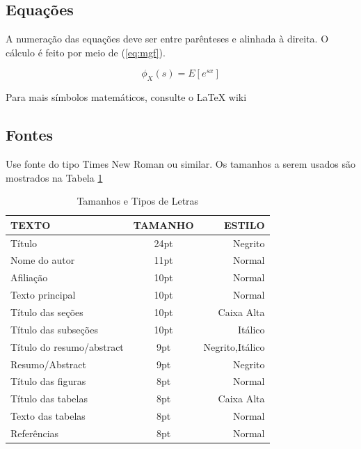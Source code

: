 \subsection{Equações}
A numeração das equações deve ser entre parênteses e alinhada à direita. O cálculo é feito por meio de (\ref{eq:mgf}).

\begin{equation}
\label{eq:mgf}
\phi_X(s)=E[e^{sx}]
\end{equation}

Para mais símbolos matemáticos, consulte o LaTeX wiki \cite{latexMath}

\subsection{Fontes}

Use fonte do tipo Times New Roman ou similar. Os tamanhos a serem usados são mostrados na Tabela \ref{tab:tabela1}

\begin{table}[h]
\centering
\caption{Tamanhos e Tipos de Letras}
\label{tab:tabela1}
\begin{adjustbox}{max width=\textwidth}
\begin{tabular}{lcr}
\hline
TEXTO                     & TAMANHO & ESTILO          \\ \hline
Título                    & 24pt    & Negrito         \\
Nome do autor             & 11pt    & Normal          \\
Afiliação                 & 10pt    & Normal          \\
Texto principal           & 10pt    & Normal          \\
Título das seções         & 10pt    & Caixa Alta      \\
Título das subseções      & 10pt    & Itálico         \\
Título do resumo/abstract & 9pt     & Negrito,Itálico \\
Resumo/Abstract           & 9pt     & Negrito         \\
Título das figuras        & 8pt     & Normal          \\
Título das tabelas        & 8pt     & Caixa Alta      \\
Texto das tabelas         & 8pt     & Normal          \\
Referências               & 8pt     & Normal          \\ \hline
\end{tabular}
\end{adjustbox}
\end{table}


